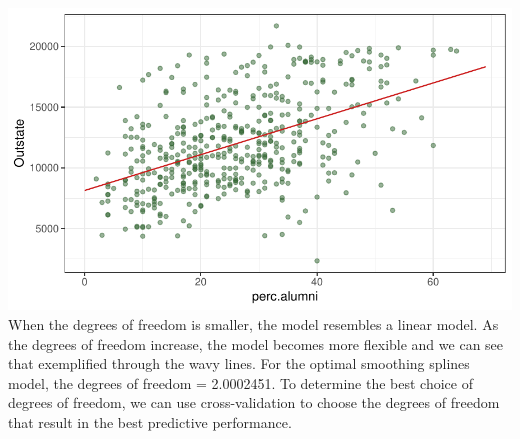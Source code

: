 \documentclass[
]{article}
\newenvironment{Shaded}{\begin{snugshade}}{\end{snugshade}}
\newcommand{\AttributeTok}[1]{\textcolor[rgb]{0.13,0.29,0.53}{#1}}
\newcommand{\CommentTok}[1]{\textcolor[rgb]{0.56,0.35,0.01}{\textit{#1}}}
\newcommand{\DecValTok}[1]{\textcolor[rgb]{0.00,0.00,0.81}{#1}}
\newcommand{\FloatTok}[1]{\textcolor[rgb]{0.00,0.00,0.81}{#1}}
\newcommand{\FunctionTok}[1]{\textcolor[rgb]{0.13,0.29,0.53}{\textbf{#1}}}
\newcommand{\NormalTok}[1]{#1}
\newcommand{\OtherTok}[1]{\textcolor[rgb]{0.56,0.35,0.01}{#1}}
\newcommand{\SpecialCharTok}[1]{\textcolor[rgb]{0.81,0.36,0.00}{\textbf{#1}}}
\begin{document}
\begin{Shaded}
\end{Shaded}

\includegraphics[width=0.9\linewidth]{HW2_co2554_files/figure-latex/smoothing_spline-2}
When the degrees of freedom is smaller, the model resembles a linear
model. As the degrees of freedom increase, the model becomes more
flexible and we can see that exemplified through the wavy lines. For the
optimal smoothing splines model, the degrees of freedom = 2.0002451. To
determine the best choice of degrees of freedom, we can use
cross-validation to choose the degrees of freedom that result in the
best predictive performance.
\end{document}
